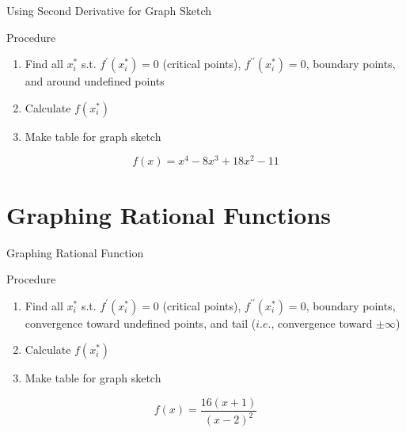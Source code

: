 \documentclass[a4paper,11pt]{article}
\begin{document}
\begin{frame}[t]{Using Second Derivative for Graph Sketch}
	\begin{block}{Procedure}
		\begin{enumerate}[(STEP 1)]
			\item Find all $x_i^\ast$ s.t. $f^\prime (x_i^\ast)=0$ (critical points), \uline{$f^{\prime\prime}(x_i^\ast)=0$}, boundary points, and around undefined points
			\item Calculate $f(x_i^\ast)$
			\item Make table for graph sketch
		\end{enumerate}
	\end{block}
	\[
		f(x) = x^4 -8x^3 + 18x^2 - 11 \tag{Ex3.1}
	\]
\end{frame}


\section{Graphing Rational Functions} %
\label{sec:graphing_rational_functions}
\begin{frame}[t]{Graphing Rational Function}
	\begin{block}{Procedure}
		\begin{enumerate}[(STEP 1)]
			\item Find all $x_i^\ast$ s.t. $f^\prime (x_i^\ast)=0$ (critical points), $f^{\prime\prime}(x_i^\ast)=0$, boundary points, convergence toward undefined points, and tail ($i.e.$, convergence toward $\pm\infty$)
			\item Calculate $f(x_i^\ast)$
			\item Make table for graph sketch
		\end{enumerate}
	\end{block}
	\[
		\tag{Ex3.6} f(x) = \frac{16(x+1)}{(x-2)^2}
	\]
\end{frame}
\end{document}
